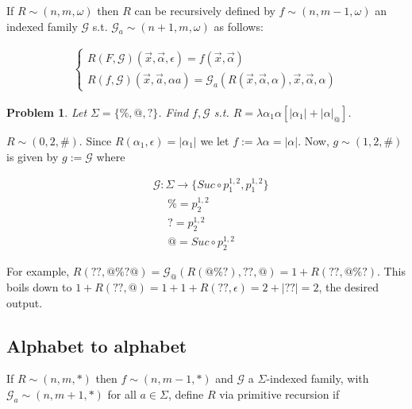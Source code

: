 \documentclass[a4paper, 12pt]{article}
\newtheorem{problem}{Problem}
\newtheorem{problem}{Problem}
\begin{document}
If $R \sim (n, m, \omega)$ then $R$ can be recursively defined by $f \sim (n, m
- 1, \omega)$ an indexed
family $\mathcal{G}$ s.t. $\mathcal{G}_a \sim (n + 1, m, \omega)$ as follows: 

\begin{align*}
    \begin{cases}
        R(F, \mathcal{G})(\overrightarrow{x}, \overrightarrow{\alpha}, \epsilon)
        = f(\overrightarrow{x}, \overrightarrow{\alpha}) \\ 
        R(f, \mathcal{G})(\overrightarrow{x}, \overrightarrow{a}, \alpha a) =
        \mathcal{G}_a \left( R(\overrightarrow{x}, \overrightarrow{\alpha},
        \alpha), \overrightarrow{x}, \overrightarrow{\alpha}, \alpha \right) 
    \end{cases}
\end{align*}

\begin{problem}
    Let $\Sigma = \{\%, @, ?\}$. Find $f, \mathcal{G}$ s.t. $R = \lambda \alpha_1
    \alpha \left[ |\alpha_1| + |\alpha|_{@} \right] $.
\end{problem}

$R \sim (0, 2, \#)$. Since $R(\alpha_1, \epsilon) = | \alpha_1|$ we let $f :=
\lambda \alpha = |\alpha|$. Now, $g \sim (1, 2, \#)$ is given by $g :=
\mathcal{G}$ where 

\begin{align*}
    &\mathcal{G} : \Sigma \to \{ Suc \circ p_1^{1, 2}, p_1^{1, 2}  \} \\ 
    &~ ~ ~ ~ ~ ~  \% = p_{2}^{1, 2}\\
    &~ ~ ~ ~ ~ ~  ? = p_{2}^{1, 2}\\
    &~ ~ ~ ~ ~ ~  @ = Suc \circ p_{2}^{1, 2}
\end{align*}

For example, $R(??, @\%?@) = \mathcal{G}_{@} \left( R(@\%?), ??, @ \right) = 1 +
R(??, @\%?) $. This boils down to $1 + R(??, @) = 1 + 1 + R(??, \epsilon) = 2 +
|??| = 2$, the desired output.

\pagebreak 

\subsection{Alphabet to alphabet}

If $R \sim (n, m, *)$ then $f \sim (n, m-1, *)$ and $\mathcal{G}$ a $\Sigma$-indexed
family, with $\mathcal{G}_a \sim (n, m+1, *)$ for all $a\in \Sigma$, define $R$
via primitive recursion if 
\end{document}
